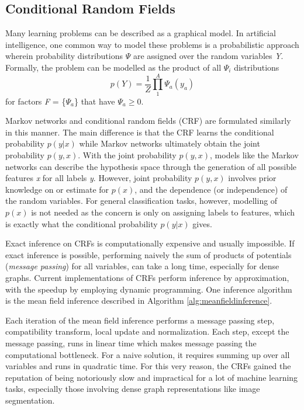 \documentclass[10pt, journal, compsoc]{IEEEtran}
\begin{document}
\subsection{Conditional Random Fields}
Many learning problems can be described as a graphical model. In artificial intelligence, one common way to model these problems is a probabilistic approach wherein probability distributions \textit{$\Psi$} are assigned over the random variables \textit{Y}. Formally, the problem can be modelled as the product of all \textit{$\Psi_i$} distributions
\begin{equation}
p(Y) = \frac{1}{Z}\prod_1^A \Psi_a(y_a)
\end{equation}
for factors \textit{F} = \{$\Psi_a$\} that have $\Psi_a \geq 0$. 
 
Markov networks and conditional random fields (CRF) are formulated similarly in this manner. The main difference is that the CRF learns the conditional probability $p(y|x)$ while Markov networks ultimately obtain the joint probability $p(y,x)$. With the joint probability $p(y,x)$, models like the Markov networks can describe the hypothesis space through the generation of all possible features \textit{x} for all labels \textit{y}. However, joint probability $p(y,x)$ involves prior knowledge on or estimate for $p(x)$, and the dependence (or independence) of the random variables. For general classification tasks, however, modelling of $p(x)$ is not needed as the concern is only on assigning labels to features, which is exactly what the conditional probability $p(y|x)$ gives.

Exact inference on CRFs is computationally expensive and usually impossible. If exact inference is possible, performing naively the sum of products of potentials (\textit{message passing}) for all variables, can take a long time, especially for dense graphs. Current implementations of CRFs perform inference by approximation, with the speedup by employing dynamic programming. One inference algorithm is the mean field inference described in Algorithm \ref{alg:meanfieldinference}.

Each iteration of the mean field inference performs a message passing step, compatibility transform, local update and normalization. Each step, except the message passing, runs in linear time which makes message passing the computational bottleneck. For a naive solution, it requires summing up over all variables and runs in quadratic time. For this very reason, the CRFs gained the reputation of being notoriously slow and impractical for a lot of machine learning tasks, especially those involving dense graph representations like image segmentation.
\end{document}
